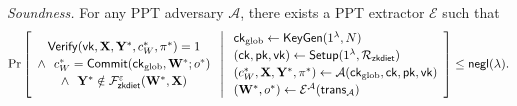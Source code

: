 \documentclass[runningheads]{llncs}
\begin{document}
\noindent\emph{Soundness.} For any PPT adversary $\mathcal{A}$, there exists a PPT extractor $\mathcal{E}$ such that
\[
  \Pr \left[
  \begin{array}{c}
    \mathsf{Verify}(\mathsf{vk}, {\mathbf{X}}, {\mathbf{Y}}^{*}, c_{W}^{*}, \pi^{*}) = 1 \\[2pt]
    \land\ \ c_{W}^{*} = \mathsf{Commit}(\mathsf{ck}_{\mathrm{glob}}, {\mathbf{W}}^{*}; o^{*}) \\[2pt]
    \land\ \ {\mathbf{Y}}^{*} \notin \mathcal{F}^{\varepsilon}_{\mathsf{zkdiet}}({\mathbf{W}}^{*}, {\mathbf{X}})
  \end{array}
  \;\middle|\;
  \begin{array}{l}
    \mathsf{ck}_{\mathrm{glob}} \leftarrow \mathsf{KeyGen}(1^{\lambda}, N) \\[2pt]
    (\mathsf{ck}, \mathsf{pk}, \mathsf{vk}) \leftarrow \mathsf{Setup}(1^{\lambda}, \mathcal{R}_{\mathsf{zkdiet}}) \\[2pt]
    (c_{W}^{*}, {\mathbf{X}}, {\mathbf{Y}}^{*}, \pi^{*}) \leftarrow \mathcal{A}(\mathsf{ck}_{\mathrm{glob}}, \mathsf{ck}, \mathsf{pk}, \mathsf{vk}) \\[2pt]
    ({\mathbf{W}}^{*}, o^{*}) \leftarrow \mathcal{E}^{\mathcal{A}}(\mathsf{trans}_{\mathcal{A}})
  \end{array}
  \right] \le \mathsf{negl}(\lambda).
\]
\end{document}
